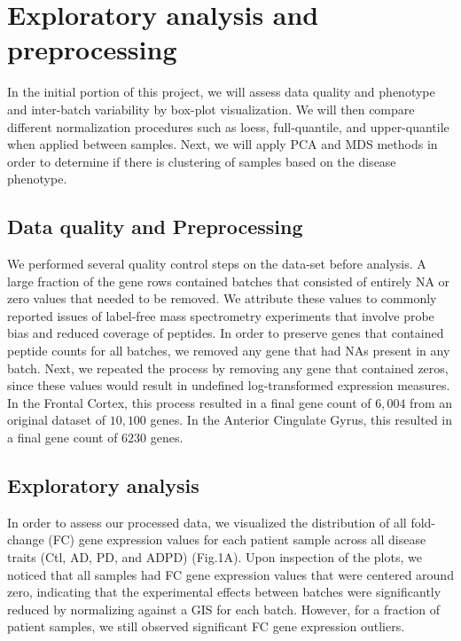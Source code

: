 \section{Exploratory analysis and preprocessing}
\label{sec:expl-analys-prepr}

 In the initial portion of this project, we will assess data quality and phenotype and  inter-batch variability by box-plot visualization. We will then compare different normalization procedures such as loess, full-quantile, and upper-quantile when applied between samples. Next, we will apply PCA and MDS methods in order to determine if there is clustering of samples based on the disease phenotype.


\subsection{Data quality and Preprocessing}
\label{subsec:data-qual-vari}

We performed several quality control steps on the data-set before analysis. A large fraction of the gene rows contained batches that consisted of entirely NA or zero values that needed to be removed. We attribute these values to commonly reported issues of label-free mass spectrometry experiments that involve probe bias and reduced coverage of peptides. In order to preserve genes that contained peptide counts for all batches, we removed any gene that had NAs present in any batch. Next, we repeated the process by removing any gene that contained zeros, since these values would result in undefined log-transformed expression measures. In the Frontal Cortex, this process resulted in a final gene count of $6,004$ from an original dataset of $10,100$ genes. In the Anterior Cingulate Gyrus, this resulted in a final gene count of $6230$ genes. 

\subsection{Exploratory analysis}
\label{subsec:exploratory-analysis}

In order to assess our processed data, we visualized the distribution of all fold-change (FC) gene expression values for each patient sample across all disease traits (Ctl, AD, PD, and ADPD) (Fig.1A). Upon inspection of the plots, we noticed that all samples had FC gene expression values that were centered around zero, indicating that the experimental effects between batches were significantly reduced by normalizing against a GIS for each batch. However, for a fraction of patient samples, we still observed significant FC gene expression outliers. 

